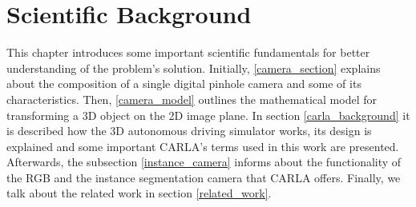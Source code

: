 \chapter{Scientific Background}
\label{background}




This chapter introduces some important scientific fundamentals for better understanding of the problem's solution. Initially, \ref{camera_section} explains about the composition of a single digital pinhole camera and some of its characteristics. Then, \ref{camera_model} outlines the mathematical model for transforming a 3D object on the 2D image plane. In section \ref{carla_background} it is described how the 3D autonomous driving simulator works, its design is explained and some important CARLA's terms used in this work are presented. Afterwards, the subsection \ref{instance_camera} informs about the functionality of the RGB and the instance segmentation camera that CARLA offers. Finally, we talk about the related work in section \ref{related_work}.

